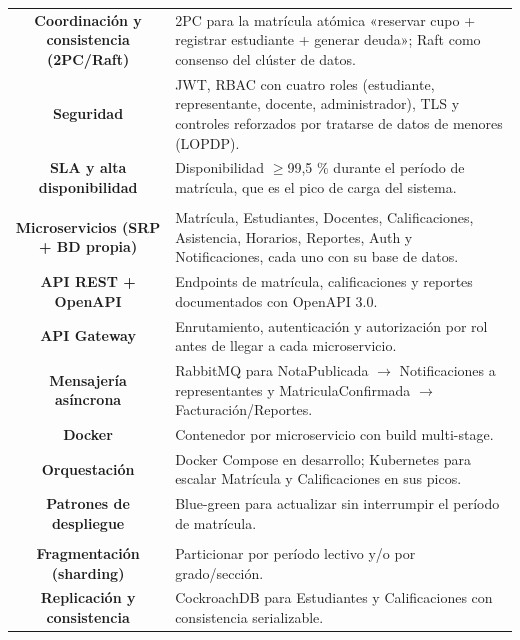 \documentclass[11pt]{article}
\begin{document}
\begin{longtable}{C A}
\textbf{Coordinación y consistencia (2PC/Raft)} & 2PC para la matrícula atómica «reservar cupo + registrar estudiante + generar deuda»; Raft como consenso del clúster de datos.\\
\textbf{Seguridad} & JWT, RBAC con cuatro roles (estudiante, representante, docente, administrador), TLS y controles reforzados por tratarse de datos de menores (LOPDP).\\
\textbf{SLA y alta disponibilidad} & Disponibilidad $\geq$99,5 \% durante el período de matrícula, que es el pico de carga del sistema.\\
\addlinespace[1pt]
\\
\textbf{Microservicios (SRP + BD propia)} & Matrícula, Estudiantes, Docentes, Calificaciones, Asistencia, Horarios, Reportes, Auth y Notificaciones, cada uno con su base de datos.\\
\textbf{API REST + OpenAPI} & Endpoints de matrícula, calificaciones y reportes documentados con OpenAPI 3.0.\\
\textbf{API Gateway} & Enrutamiento, autenticación y autorización por rol antes de llegar a cada microservicio.\\
\textbf{Mensajería asíncrona} & RabbitMQ para NotaPublicada $\rightarrow$ Notificaciones a representantes y MatriculaConfirmada $\rightarrow$ Facturación/Reportes.\\
\textbf{Docker} & Contenedor por microservicio con build multi-stage.\\
\textbf{Orquestación} & Docker Compose en desarrollo; Kubernetes para escalar Matrícula y Calificaciones en sus picos.\\
\textbf{Patrones de despliegue} & Blue-green para actualizar sin interrumpir el período de matrícula.\\
\addlinespace[1pt]
\\
\textbf{Fragmentación (sharding)} & Particionar por período lectivo y/o por grado/sección.\\
\textbf{Replicación y consistencia} & CockroachDB para Estudiantes y Calificaciones con consistencia serializable.\\

\end{longtable}
\end{document}
